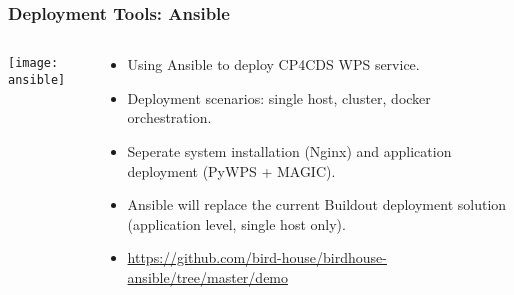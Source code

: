\documentclass{beamer}
\begin{document}
\begin{frame}
\frametitle<presentation>{Deployment Tools: Ansible}
  \begin{columns}[c]
    \begin{column}{.2\textwidth}
      \texttt{[image: ansible]}
    \end{column}
    \begin{column}{.8\textwidth}
      \begin{itemize}
        \item Using Ansible to deploy CP4CDS WPS service.
        \item Deployment scenarios: single host, cluster, docker orchestration.
        \item Seperate system installation (Nginx) and application deployment (PyWPS + MAGIC).
        \item Ansible will replace the current Buildout deployment solution (application level, single host only).
        \item \footnotesize{\url{https://github.com/bird-house/birdhouse-ansible/tree/master/demo}}
      \end{itemize}
    \end{column}
  \end{columns}
\end{frame}
\end{document}
